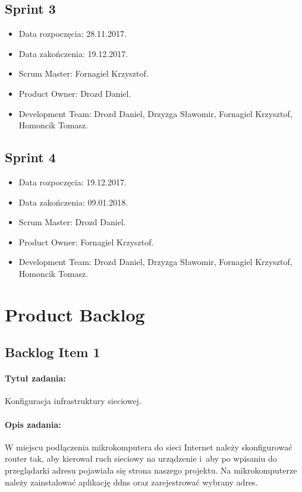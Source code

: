 	\subsection{Sprint 3}
	\begin{itemize}
		\item Data rozpoczęcia: 28.11.2017.
		\item Data zakończenia: 19.12.2017.
		\item Scrum Master: Fornagiel Krzysztof.
		\item Product Owner: Drozd Daniel.
		\item Development Team: Drozd Daniel, Drzyzga Sławomir, Fornagiel Krzysztof, Homoncik Tomasz.
	\end{itemize}
	
	\subsection{Sprint 4}
	\begin{itemize}
		\item Data rozpoczęcia: 19.12.2017.
		\item Data zakończenia: 09.01.2018.
		\item Scrum Master: Drozd Daniel.
		\item Product Owner: Fornagiel Krzysztof.
		\item Development Team: Drozd Daniel, Drzyzga Sławomir, Fornagiel Krzysztof, Homoncik Tomasz.
	\end{itemize}
	
\section{Product Backlog}
	\subsection{Backlog Item 1}
	\paragraph{Tytuł zadania:}
	Konfiguracja infrastruktury sieciowej.
	
	\paragraph{Opis zadania:}
	W miejscu podłączenia mikrokomputera do sieci Internet należy skonfigurować router tak, aby kierował ruch sieciowy na urządzenie i~aby po wpisaniu do przeglądarki adresu pojawiała się strona naszego projektu. Na mikrokomputerze należy zainstalować aplikację ddns oraz zarejestrować wybrany adres.
	
